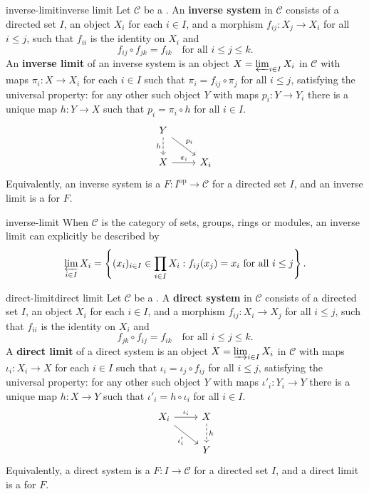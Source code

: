 \begin{topic}{inverse-limit}{inverse limit}
    Let $\mathcal{C}$ be a . An \textbf{inverse system} in $\mathcal{C}$ consists of a directed set $I$, an object $X_i$ for each $i \in I$, and a morphism $f_{ij} : X_j \to X_i$ for all $i \le j$, such that $f_{ii}$ is the identity on $X_i$ and
    \[ f_{ij} \circ f_{jk} = f_{ik} \quad \text{for all } i \le j \le k . \]
    An \textbf{inverse limit} of an inverse system is an object $X = \varprojlim_{i \in I} X_i$ in $\mathcal{C}$ with maps $\pi_i : X \to X_i$ for each $i \in I$ such that $\pi_i = f_{ij} \circ \pi_j$ for all $i \le j$, satisfying the universal property: for any other such object $Y$ with maps $p_i : Y \to Y_i$ there is a unique map $h : Y \to X$ such that $p_i = \pi_i \circ h$ for all $i \in I$.
    \[ \begin{tikzcd} Y \arrow[dashed, swap]{d}{h} \arrow{dr}{p_i} & \\ X \arrow{r}{\pi_i} & X_i \end{tikzcd} \]
    Equivalently, an inverse system is a  $F : I^\text{op} \to \mathcal{C}$ for a directed set $I$, and an inverse limit is a  for $F$.
\end{topic}

\begin{example}{inverse-limit}
    When $\mathcal{C}$ is the category of sets, groups, rings or modules, an inverse limit can explicitly be described by
    \[ \varprojlim_{i \in I} X_i = \left\{ (x_i)_{i \in I} \in \prod_{i \in I} X_i : f_{ij}(x_j) = x_i \text{ for all } i \le j \right\} . \]
\end{example}

\begin{topic}{direct-limit}{direct limit}
    Let $\mathcal{C}$ be a . A \textbf{direct system} in $\mathcal{C}$ consists of a directed set $I$, an object $X_i$ for each $i \in I$, and a morphism $f_{ij} : X_i \to X_j$ for all $i \le j$, such that $f_{ii}$ is the identity on $X_i$ and
    \[ f_{jk} \circ f_{ij} = f_{ik} \quad \text{for all } i \le j \le k . \]
    A \textbf{direct limit} of a direct system is an object $X = \varinjlim_{i \in I} X_i$ in $\mathcal{C}$ with maps $\iota_i : X_i \to X$ for each $i \in I$ such that $\iota_i = \iota_j \circ f_{ij}$ for all $i \le j$, satisfying the universal property: for any other such object $Y$ with maps $\iota'_i : Y_i \to Y$ there is a unique map $h : X \to Y$ such that $\iota'_i = h \circ \iota_i$ for all $i \in I$.
    \[ \begin{tikzcd} X_i \arrow{r}{\iota_i} \arrow[swap]{dr}{\iota'_i} & X \arrow[dashed]{d}{h} \\ & Y \end{tikzcd} \]
    Equivalently, a direct system is a  $F : I \to \mathcal{C}$ for a directed set $I$, and a direct limit is a  for $F$.
\end{topic}

